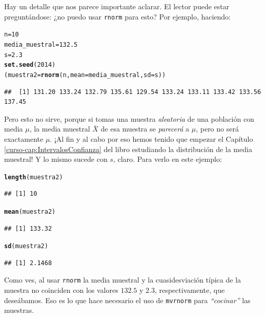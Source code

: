 \documentclass[10pt,a4paper]{article}\usepackage[]{graphicx}\usepackage[]{color}
\makeatletter
\newcommand{\hlnum}[1]{\textcolor[rgb]{0.686,0.059,0.569}{#1}}%
\newcommand{\hlstd}[1]{\textcolor[rgb]{0.345,0.345,0.345}{#1}}%
\newcommand{\hlkwb}[1]{\textcolor[rgb]{0.69,0.353,0.396}{#1}}%
\newcommand{\hlkwc}[1]{\textcolor[rgb]{0.333,0.667,0.333}{#1}}%
\newcommand{\hlkwd}[1]{\textcolor[rgb]{0.737,0.353,0.396}{\textbf{#1}}}%
\newenvironment{kframe}{%
 \def\at@end@of@kframe{}%
 \ifinner\ifhmode%
  \def\at@end@of@kframe{\end{minipage}}%
  \begin{minipage}{\columnwidth}%
 \fi\fi%
 \def\FrameCommand##1{\hskip\@totalleftmargin \hskip-\fboxsep
 \colorbox{shadecolor}{##1}\hskip-\fboxsep
     \hskip-\linewidth \hskip-\@totalleftmargin \hskip\columnwidth}%
 \MakeFramed {\advance\hsize-\width
   \@totalleftmargin\z@ \linewidth\hsize
   \@setminipage}}%
 {\par\unskip\endMakeFramed%
 \at@end@of@kframe}
\newenvironment{knitrout}{}{} %
\makeatother
\begin{document}
Hay un detalle que nos parece importante aclarar. El lector puede estar preguntándose: ¿no puedo usar {\tt rnorm} para esto? Por ejemplo, haciendo:

\begin{knitrout}
\color{fgcolor}\begin{kframe}
\begin{alltt}
\hlstd{n} \hlkwb{=} \hlnum{10}
\hlstd{media_muestral} \hlkwb{=} \hlnum{132.5}
\hlstd{s} \hlkwb{=} \hlnum{2.3}
\hlkwd{set.seed}\hlstd{(}\hlnum{2014}\hlstd{)}
\hlstd{(muestra2} \hlkwb{=} \hlkwd{rnorm}\hlstd{(n,} \hlkwc{mean}\hlstd{=media_muestral,} \hlkwc{sd}\hlstd{=s))}
\end{alltt}
\begin{verbatim}
##  [1] 131.20 133.24 132.79 135.61 129.54 133.24 133.11 133.42 133.56 137.45
\end{verbatim}
\end{kframe}
\end{knitrout}
Pero esto no sirve, porque si tomas una muestra {\em aleatoria} de una población con media $\mu$, la media muestral $\bar X$ de esa muestra se {\em parecerá} a $\mu$, pero no será exactamente $\mu$. ¡Al fin y al cabo por eso hemos tenido que empezar el Capítulo \ref{curso-cap:IntervalosConfianza} del libro estudiando la distribución de la media muestral! Y lo mismo sucede con $s$, claro. Para verlo en este ejemplo:
\begin{knitrout}
\color{fgcolor}\begin{kframe}
\begin{alltt}
\hlkwd{length}\hlstd{(muestra2)}
\end{alltt}
\begin{verbatim}
## [1] 10
\end{verbatim}
\begin{alltt}
\hlkwd{mean}\hlstd{(muestra2)}
\end{alltt}
\begin{verbatim}
## [1] 133.32
\end{verbatim}
\begin{alltt}
\hlkwd{sd}\hlstd{(muestra2)}
\end{alltt}
\begin{verbatim}
## [1] 2.1468
\end{verbatim}
\end{kframe}
\end{knitrout}
Como ves, al usar {\tt rnorm} la media muestral y la cuasidesviación típica de la muestra no coinciden con los valores $132.5$ y $2.3$, respectivamente, que deseábamos. Eso es lo que hace necesario el uso de {\tt mvrnorm} para {\em ``cocinar''} las muestras.
\end{document}
